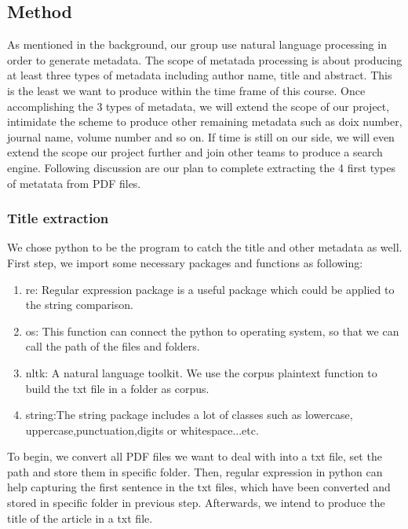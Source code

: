 \subsection{Method}

As mentioned in the background, our group use natural language processing in order to generate metadata. 
The scope of metatada processing is about producing at least three types of metadata including author name, title and abstract. 
This is the least we want to produce within the time frame of this course. 
Once accomplishing the 3 types of metadata, we will extend the scope of our project, intimidate the scheme to produce other remaining metadata such as doix number, journal name, volume number and so on. 
If time is still on our side, we will even extend the scope our project further and join other teams to produce a search engine. 
Following discussion are our plan to complete extracting the 4 first types of metatata from PDF files.

\subsubsection{Title extraction}
We chose python to be the program to catch the title and other metadata as well. 
First step, we import some necessary packages and functions as following:
\begin{enumerate}
	\item re: Regular expression package is a useful package which could be applied to the string comparison.
	\item os: This function can connect the python to operating system, so that we can call the path of the files and folders.
	\item nltk: A natural language toolkit. We use the corpus plaintext function to build the txt file in a folder as corpus.
	\item string:The string package includes a lot of classes such as lowercase, uppercase,punctuation,digits or whitespace...etc. 
\end{enumerate}  
To begin, we convert all PDF files we want to deal with into a txt file, set the path and store them in specific folder. 
Then, regular expression in python can help capturing the first sentence in the txt files, which have been converted and stored in specific folder in previous step. 
Afterwards, we intend to produce the title of the article in a txt file.   


